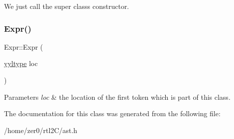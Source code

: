 We just call the super class\textquotesingle{}s constructor. \mbox{\label{class_expr_ae45abbf50387f67dbc1a408816515e1f}} 
\subsubsection{\texorpdfstring{Expr()}{Expr()}\hspace{0.1cm}{\footnotesize\ttfamily [2/2]}}
{\footnotesize\ttfamily Expr\+::\+Expr (\begin{DoxyParamCaption}\item[{\hyperlink{structyyltype}{yyltype}}]{loc }\end{DoxyParamCaption})\hspace{0.3cm}{\ttfamily [inline]}}


\begin{DoxyParams}{Parameters}
{\em loc} & the location of the first token which is part of this class. \\
\hline
\end{DoxyParams}


The documentation for this class was generated from the following file\+:\begin{DoxyCompactItemize}
\item 
/home/zer0/rtl2\+C/ast.\+h\end{DoxyCompactItemize}
